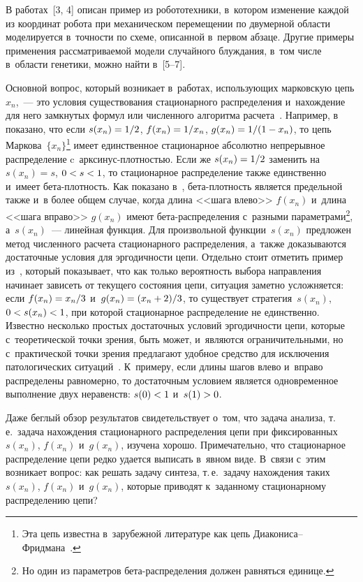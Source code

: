 \begin{multicols}{2}
  В работах~[3, 4] описан пример из робототехники, в~котором изменение 
каждой из координат робота при механическом перемещении по двумерной 
области моделируется в~точ\-ности по схеме, описанной в~первом абзаце. 
Другие примеры применения рас\-смат\-ри\-ва\-емой модели случайного 
блуж\-да\-ния, в~том чис\-ле в~об\-ласти генетики, мож\-но найти в~[5--7].
  
  Основной вопрос, который возникает в~работах, ис\-поль\-зу\-ющих 
марковскую цепь $x_n$,~--- это условия существования стационарного 
распределения и~на\-хож\-де\-ние для него замкнутых формул или чис\-лен\-но\-го 
алгоритма расчета~\cite{3-kr, 4-kr, 8-kr, 9-kr, 10-kr}. Например, в~\cite{8-kr} 
показано, что если $s(x_n)\hm=1/2$, $f(x_n)\hm=1/x_n$, $g(x_n)\hm=1/(1\hm-
x_n)$, то цепь Маркова~$\{x_n\}$\footnote[3]{Эта цепь известна в~зарубежной 
литературе как цепь Диа\-ко\-ни\-са--Фрид\-ма\-на~\cite{8-kr}.} имеет единственное 
стационарное абсолютно непрерывное распределение  
c~арк\-си\-нус-плот\-ностью. Если же $s(x_n)\hm=1/2$ заменить на 
$s(x_n)=s$, $0\hm<s\hm<1$, то стационарное распределение также 
единственно и~имеет бе\-та-плот\-ность. Как показано в~\cite{4-kr},  
бе\-та-плот\-ность является предельной так\-же и~в более общем случае, когда 
длина <<шага влево>> $f(x_n)$ и~длина <<шага вправо>> $g(x_n)$ имеют  
бе\-та-рас\-пре\-де\-ле\-ния с~разными па\-ра\-мет\-ра\-ми\footnote[1]{Но один из 
параметров бета-распределения должен равняться единице.}, а~$s(x_n)$~--- линейная 
функция. Для произвольной функции~$s(x_n)$ предложен метод чис\-лен\-но\-го 
расчета стационарного распределения, а~так\-же доказываются достаточные 
условия для эргодичности цепи. Отдельно стоит отметить пример 
из~\cite{11-kr}, который показывает, что как только ве\-ро\-ят\-ность выбора 
на\-прав\-ле\-ния начинает зависеть от текущего со\-сто\-яния цепи, ситуация 
заметно услож\-ня\-ет\-ся: если $f(x_n)\hm= x_n/3$ и~$g(x_n)\hm= (x_n\hm+2)/3$, 
то существует стратегия~$s(x_n)$, $0\hm< s(x_n)\hm<1$, при которой 
стационарное распределение не единственно. 
%
Известно несколько простых 
достаточных условий эргодичности цепи, которые с~тео\-ре\-ти\-че\-ской точ\-ки 
зрения, быть может, и~являются ограничительными, но с~практической точки 
зрения предлагают удобное средство для исключения патологических 
ситуаций~\cite{3-kr, 4-kr}. К~примеру, если длины шагов влево и~вправо 
распределены равномерно, то достаточным условием является 
одновременное выполнение двух неравенств: $s(0)\hm<1$ и~$s(1)\hm>0$.
  
  Даже беглый обзор результатов свидетельствует о~том, что задача анализа, 
т.\,е.\ задача нахождения стационарного распределения цепи при 
фиксированных $s(x_n)$, $f(x_n)$ и~$g(x_n)$, изучена хорошо. 
Примечательно, что стационарное распределение цепи редко удается 
выписать в~явном виде. В~связи с~этим возникает вопрос: как решать задачу 
синтеза, т.\,е.\ задачу на\-хож\-де\-ния таких $s(x_n)$, $f(x_n)$ и~$g(x_n)$, 
которые приводят к~заданному стационарному распределению цепи? 


\end{multicols}
